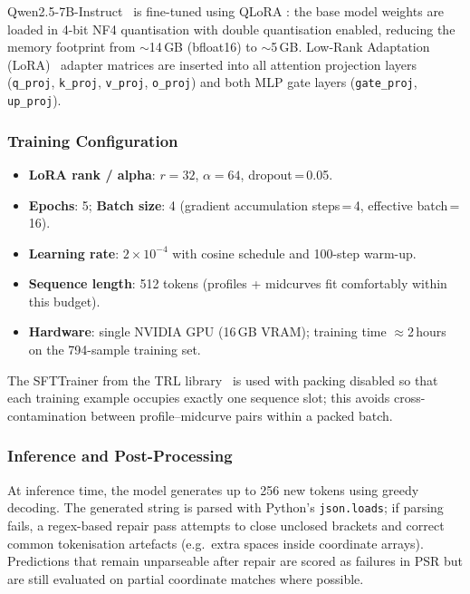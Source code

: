 \documentclass[journal]{IEEEtran}
\begin{document}
Qwen2.5-7B-Instruct~\cite{qwen2023qwen} is fine-tuned using QLoRA
\cite{dettmers2023qlora}: the base model weights are loaded in 4-bit NF4
quantisation with double quantisation enabled, reducing the memory footprint
from $\sim$14\,GB (bfloat16) to $\sim$5\,GB.  Low-Rank Adaptation
(LoRA)~\cite{hu2022lora} adapter matrices are inserted into all attention
projection layers (\texttt{q\_proj}, \texttt{k\_proj}, \texttt{v\_proj},
\texttt{o\_proj}) and both MLP gate layers (\texttt{gate\_proj},
\texttt{up\_proj}).

\subsubsection{Training Configuration}

\begin{itemize}
  \item \textbf{LoRA rank / alpha}: $r = 32$, $\alpha = 64$, dropout\,=\,0.05.
  \item \textbf{Epochs}: 5; \textbf{Batch size}: 4 (gradient accumulation
        steps\,=\,4, effective batch\,=\,16).
  \item \textbf{Learning rate}: $2 \times 10^{-4}$ with cosine schedule and
        100-step warm-up.
  \item \textbf{Sequence length}: 512 tokens (profiles + midcurves fit
        comfortably within this budget).
  \item \textbf{Hardware}: single NVIDIA GPU (16\,GB VRAM); training time
        $\approx$2\,hours on the 794-sample training set.
\end{itemize}

The SFTTrainer from the TRL library~\cite{vonwerra2022trl} is used with
packing disabled so that each training example occupies exactly one sequence
slot; this avoids cross-contamination between profile--midcurve pairs within
a packed batch.

\subsubsection{Inference and Post-Processing}

At inference time, the model generates up to 256 new tokens using greedy
decoding.  The generated string is parsed with Python's \texttt{json.loads};
if parsing fails, a regex-based repair pass attempts to close unclosed brackets
and correct common tokenisation artefacts (e.g.\ extra spaces inside
coordinate arrays).  Predictions that remain unparseable after repair are
scored as failures in PSR but are still evaluated on partial coordinate
matches where possible.
\end{document}
